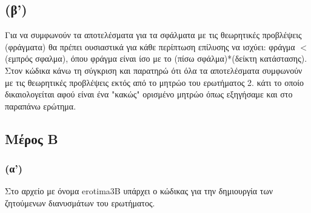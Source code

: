 \documentclass{article}
\begin{document}
\subsection*{(β')}
Για να συμφωνούν τα αποτελέσματα για τα σφάλματα με τις θεωρητικές προβλέψεις (φράγματα) θα πρέπει ουσιαστικά για κάθε περίπτωση επίλυσης να ισχύει: φράγμα $<$ (εμπρός σφαλμα), όπου φράγμα είναι ίσο με το (πίσω σφάλμα)*(δείκτη κατάστασης). Στον κώδικα κάνω τη σύγκριση και παρατηρώ ότι όλα τα αποτελέσματα συμφωνούν με τις θεωρητικές προβλέψεις εκτός από το μητρώο του ερωτήματος 2. κάτι το οποίο δικαιολογείται αφού είναι ένα "κακώς" ορισμένο μητρώο όπως εξηγήσαμε και στο παραπάνω ερώτημα.
\subsection*{Μέρος Β}
\subsubsection*{(α')}
Στο αρχείο με όνομα  erotima3B  υπάρχει ο κώδικας για την δημιουργία των ζητούμενων διανυσμάτων του ερωτήματος.
\end{document}
